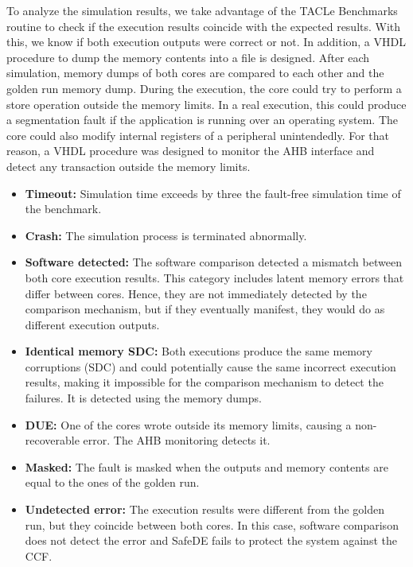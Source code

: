 To analyze the simulation results, we take advantage of the TACLe Benchmarks routine to check if the execution results coincide with the expected results. With this, we know if both execution outputs were correct or not. In addition, a VHDL procedure to dump the memory contents into a file is designed. After each simulation, memory dumps of both cores are compared to each other and the golden run memory dump. During the execution, the core could try to perform a store operation outside the memory limits. In a real execution, this could produce a segmentation fault if the application is running over an operating system. The core could also modify internal registers of a peripheral unintendedly. For that reason, a VHDL procedure was designed to monitor the AHB interface and detect any transaction outside the memory limits.

\begin{itemize}
    \item \textbf{Timeout:} Simulation time exceeds by three the fault-free simulation time of the benchmark.
    \item \textbf{Crash:} The simulation process is terminated abnormally.
    \item \textbf{Software detected:} The software comparison detected a mismatch between both core execution results. This category includes latent memory errors that differ between cores. Hence, they are not immediately detected by the comparison mechanism, but if they eventually manifest, they would do as different execution outputs.
    \item \textbf{Identical memory SDC:} Both executions produce the same memory corruptions (SDC) and could potentially cause the same incorrect execution results, making it impossible for the comparison mechanism to detect the failures. It is detected using the memory dumps.
    \item \textbf{DUE:} One of the cores wrote outside its memory limits, causing a non-recoverable error. The AHB monitoring detects it.
    \item \textbf{Masked:} The fault is masked when the outputs and memory contents are equal to the ones of the golden run.
    \item \textbf{Undetected error:} The execution results were different from the golden run, but they coincide between both cores. In this case, software comparison does not detect the error and SafeDE fails to protect the system against the CCF.
\end{itemize}


